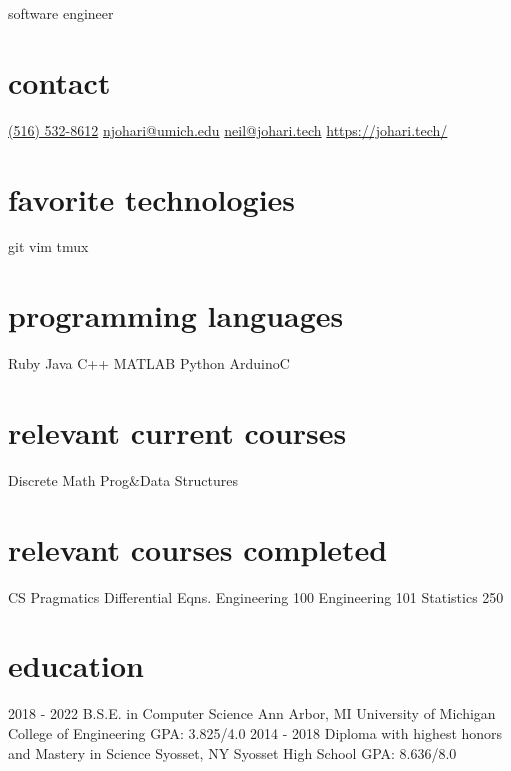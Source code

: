 \documentclass[]{friggeri-cv}
\begin{document}
{\faDesktop\hspace{.2cm} software engineer}


\begin{aside}
    \section{contact}
    \href{tel:+15165328612}{(516) 532-8612}
    \href{mailto:njohari@umich.edu}{njohari@umich.edu}
    \href{mailto:neil@johari.tech}{neil@johari.tech}
    \href{https://johari.tech/}{https://johari.tech/}
    \section{favorite technologies}
    git
    vim
    tmux
    \section{programming languages}
    Ruby
    Java 
    C++
    MATLAB
    Python
    ArduinoC
    \section{relevant current courses}
    Discrete Math
    Prog\&Data Structures
    \section{relevant courses completed}
    CS Pragmatics
    Differential Eqns.
    Engineering 100
    Engineering 101
    Statistics 250
\end{aside}

\section{education}

\begin{entrylist}
    \educationentry
    {2018 - 2022}
    {B.S.E. {\normalfont in Computer Science}}
    {Ann Arbor, MI}
    {University of Michigan College of Engineering}
    {GPA: 3.825/4.0}
    \educationentry
    {2014 - 2018}
    {Diploma {\normalfont with highest honors and Mastery in Science}}
    {Syosset, NY}
    {Syosset High School}
    {GPA: 8.636/8.0}

\end{entrylist}
\end{document}
